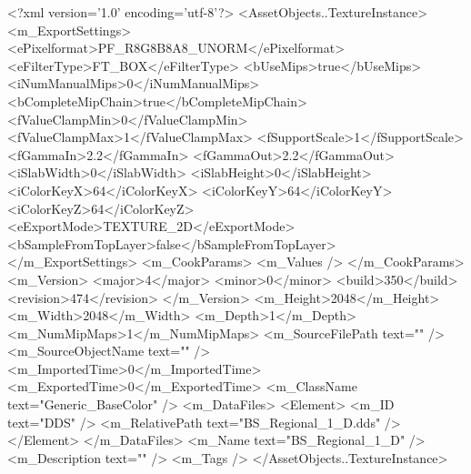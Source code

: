 <?xml version='1.0' encoding='utf-8'?>
<AssetObjects..TextureInstance>
  <m_ExportSettings>
    <ePixelformat>PF_R8G8B8A8_UNORM</ePixelformat>
    <eFilterType>FT_BOX</eFilterType>
    <bUseMips>true</bUseMips>
    <iNumManualMips>0</iNumManualMips>
    <bCompleteMipChain>true</bCompleteMipChain>
    <fValueClampMin>0</fValueClampMin>
    <fValueClampMax>1</fValueClampMax>
    <fSupportScale>1</fSupportScale>
    <fGammaIn>2.2</fGammaIn>
    <fGammaOut>2.2</fGammaOut>
    <iSlabWidth>0</iSlabWidth>
    <iSlabHeight>0</iSlabHeight>
    <iColorKeyX>64</iColorKeyX>
    <iColorKeyY>64</iColorKeyY>
    <iColorKeyZ>64</iColorKeyZ>
    <eExportMode>TEXTURE_2D</eExportMode>
    <bSampleFromTopLayer>false</bSampleFromTopLayer>
  </m_ExportSettings>
  <m_CookParams>
    <m_Values />
  </m_CookParams>
  <m_Version>
    <major>4</major>
    <minor>0</minor>
    <build>350</build>
    <revision>474</revision>
  </m_Version>
  <m_Height>2048</m_Height>
  <m_Width>2048</m_Width>
  <m_Depth>1</m_Depth>
  <m_NumMipMaps>1</m_NumMipMaps>
  <m_SourceFilePath text="" />
  <m_SourceObjectName text="" />
  <m_ImportedTime>0</m_ImportedTime>
  <m_ExportedTime>0</m_ExportedTime>
  <m_ClassName text="Generic_BaseColor" />
  <m_DataFiles>
    <Element>
      <m_ID text="DDS" />
      <m_RelativePath text="BS_Regional_1_D.dds" />
    </Element>
  </m_DataFiles>
  <m_Name text="BS_Regional_1_D" />
  <m_Description text="" />
  <m_Tags />
</AssetObjects..TextureInstance>